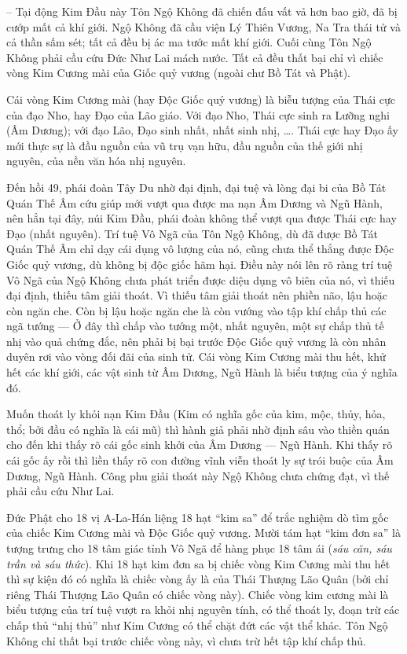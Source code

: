 -- Tại động Kim Đầu này Tôn Ngộ Không đã chiến đấu vất vả hơn bao giờ, đã bị cướp mất cả khí giới. Ngộ Không đã cầu viện Lý Thiên Vương, Na Tra thái tử và cả thần sấm sét; tất cả đều bị ác ma tước mất khí giới. Cuối cùng Tôn Ngộ Không phải cầu cứu Đức Như Lai mách nước. Tất cả đều thất bại chỉ vì chiếc vòng Kim Cương mài của Giốc quỷ vương (ngoài chư Bồ Tát và Phật).

Cái vòng Kim Cương mài (hay Độc Giốc quỷ vương) là biễu tượng của Thái cực của đạo Nho, hay Đạo của Lão giáo. Với đạo Nho, Thái cực sinh ra Lưỡng nghi (Âm Dương); với đạo Lão, Đạo sinh nhất, nhất sinh nhị, \ldots. Thái cực hay Đạo ấy mới thực sự là đầu nguồn của vũ trụ vạn hữu, đầu nguồn của thế giới nhị nguyên, của nền văn hóa nhị nguyên.

Đến hồi 49, phái đoàn Tây Du nhờ đại định, đại tuệ và lòng đại bi của Bồ Tát Quán Thế Âm cứu giúp mới vượt qua được ma nạn Âm Dương và Ngũ Hành, nên hẳn tại đây, núi Kim Đầu, phái đoàn không thể vượt qua được Thái cực hay Đạo (nhất nguyên). Trí tuệ Vô Ngã của Tôn Ngộ Không, dù đã được Bồ Tát Quán Thế Âm chỉ dạy cái dụng vô lượng của nó, cũng chưa thể thắng được Độc Giốc quỷ vương, dù không bị độc giốc hãm hại. Điều này nói lên rõ ràng trí tuệ Vô Ngã của Ngộ Không chưa phát triển được diệu dụng vô biên của nó, vì thiếu đại định, thiếu tâm giải thoát. Vì thiếu tâm giải thoát nên phiền não, lậu hoặc còn ngăn che. Còn bị lậu hoặc ngăn che là còn vướng vào tập khí chấp thủ các ngã tướng --- Ở đây thì chấp vào tướng một, nhất nguyên, một sự chấp thủ tế nhị vào quả chứng đắc, nên phải bị bại trước Độc Giốc quỷ vương là còn nhân duyên rơi vào vòng đối đãi của sinh tử. Cái vòng Kim Cương mài thu hết, khử hết các khí giới, các vật sinh từ Âm Dương, Ngũ Hành là biểu tượng của ý nghĩa đó.

Muốn thoát ly khỏi nạn Kim Đầu (Kim có nghĩa gốc của kim, mộc, thủy, hỏa, thổ; bởi đầu có nghĩa là cái mũ) thì hành giả phải nhờ định sâu vào thiền quán cho đến khi thấy rõ cái gốc sinh khởi của Âm Dương --- Ngũ Hành. Khi thấy rõ cái gốc ấy rồi thì liền thấy rõ con đường vĩnh viễn thoát ly sự trói buộc của Âm Dương, Ngũ Hành. Công phu giải thoát này Ngộ Không chưa chứng đạt, vì thế phải cầu cứu Như Lai.

Đức Phật cho 18 vị A-La-Hán liệng 18 hạt ``kim sa'' để trắc nghiệm dò tìm gốc của chiếc Kim Cương mài và Độc Giốc quỷ vương. Mười tám hạt ``kim đơn sa'' là tượng trưng cho 18 tâm giác tỉnh Vô Ngã để hàng phục 18 tâm ái (\emph{sáu căn, sáu trần và sáu thức}). Khi 18 hạt kim đơn sa bị chiếc vòng Kim Cương mài thu hết thì sự kiện đó có nghĩa là chiếc vòng ấy là của Thái Thượng Lão Quân (bởi chỉ riêng Thái Thượng Lão Quân có chiếc vòng này). Chiếc vòng kim cương mài là biểu tượng của trí tuệ vượt ra khỏi nhị nguyên tính, có thể thoát ly, đoạn trừ các chấp thủ ``nhị thủ'' như Kim Cương có thể chặt đứt các vật thể khác. Tôn Ngộ Không chỉ thất bại trước chiếc vòng này, vì chưa trừ hết tập khí chấp thủ.

